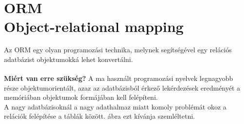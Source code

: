 \section{ORM\\\small{Object-relational mapping}}
\label{ORM}
Az ORM egy olyan programozási technika, melynek segítségével egy relációs adatbázist objektumokká lehet konvertálni.\\
\hfill \\
\textbf{Miért van erre szükség?}
A ma használt programozási nyelvek legnagyobb része objektumorientált, azaz az adatbázisból érkező lekérdezések eredményét a memóriában objektumok formájában kell felépíteni.\hfill\\
A nagy adatbázisoknál a nagy adathalmaz miatt komoly problémát okoz a relációk felépítése a táblák között.  ábra ezt kívánja szemléltetni.

